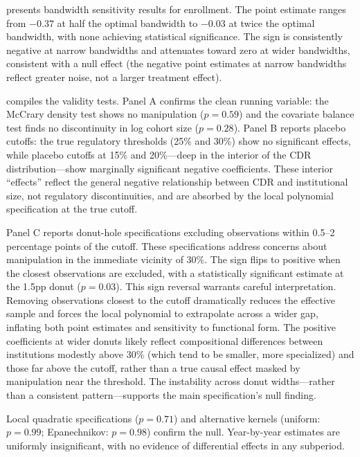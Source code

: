 \documentclass[12pt]{article}
\begin{document}
 presents bandwidth sensitivity results for enrollment. The point estimate ranges from $-0.37$ at half the optimal bandwidth to $-0.03$ at twice the optimal bandwidth, with none achieving statistical significance. The sign is consistently negative at narrow bandwidths and attenuates toward zero at wider bandwidths, consistent with a null effect (the negative point estimates at narrow bandwidths reflect greater noise, not a larger treatment effect).



 compiles the validity tests. Panel A confirms the clean running variable: the McCrary density test shows no manipulation ($p=0.59$) and the covariate balance test finds no discontinuity in log cohort size ($p=0.28$). Panel B reports placebo cutoffs: the true regulatory thresholds (25\% and 30\%) show no significant effects, while placebo cutoffs at 15\% and 20\%---deep in the interior of the CDR distribution---show marginally significant negative coefficients. These interior ``effects'' reflect the general negative relationship between CDR and institutional size, not regulatory discontinuities, and are absorbed by the local polynomial specification at the true cutoff.

Panel C reports donut-hole specifications excluding observations within 0.5--2 percentage points of the cutoff. These specifications address concerns about manipulation in the immediate vicinity of 30\%. The sign flips to positive when the closest observations are excluded, with a statistically significant estimate at the 1.5pp donut ($p=0.03$). This sign reversal warrants careful interpretation. Removing observations closest to the cutoff dramatically reduces the effective sample and forces the local polynomial to extrapolate across a wider gap, inflating both point estimates and sensitivity to functional form. The positive coefficients at wider donuts likely reflect compositional differences between institutions modestly above 30\% (which tend to be smaller, more specialized) and those far above the cutoff, rather than a true causal effect masked by manipulation near the threshold. The instability across donut widths---rather than a consistent pattern---supports the main specification's null finding.

Local quadratic specifications ($p=0.71$) and alternative kernels (uniform: $p=0.99$; Epanechnikov: $p=0.98$) confirm the null. Year-by-year estimates are uniformly insignificant, with no evidence of differential effects in any subperiod.
\end{document}
